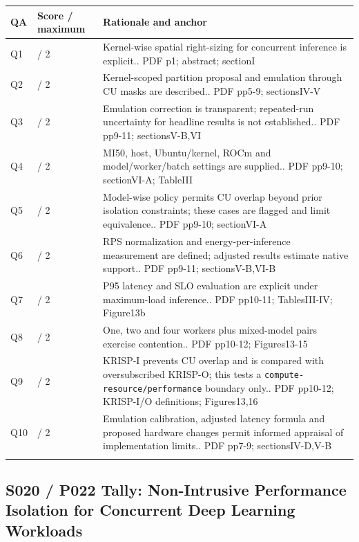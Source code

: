 \begin{longtable}{>{\raggedright\arraybackslash}p{}>{\raggedright\arraybackslash}p{}>{\raggedright\arraybackslash}p{}}
\toprule
\textbf{QA} & \textbf{Score / maximum} & \textbf{Rationale and anchor}\\\midrule\endhead
Q1 & 2 / 2 & Kernel-wise spatial right-sizing for concurrent inference is explicit.. PDF p1; abstract; sectionI\\\addlinespace
Q2 & 2 / 2 & Kernel-scoped partition proposal and emulation through CU masks are described.. PDF pp5-9; sectionsIV-V\\\addlinespace
Q3 & 1 / 2 & Emulation correction is transparent; repeated-run uncertainty for headline results is not established.. PDF pp9-11; sectionsV-B,VI\\\addlinespace
Q4 & 2 / 2 & MI50, host, Ubuntu/kernel, ROCm and model/worker/batch settings are supplied.. PDF pp9-10; sectionVI-A; TableIII\\\addlinespace
Q5 & 1 / 2 & Model-wise policy permits CU overlap beyond prior isolation constraints; these cases are flagged and limit equivalence.. PDF pp9-10; sectionVI-A\\\addlinespace
Q6 & 2 / 2 & RPS normalization and energy-per-inference measurement are defined; adjusted results estimate native support.. PDF pp9-11; sectionsV-B,VI-B\\\addlinespace
Q7 & 2 / 2 & P95 latency and SLO evaluation are explicit under maximum-load inference.. PDF pp10-11; TablesIII-IV; Figure13b\\\addlinespace
Q8 & 2 / 2 & One, two and four workers plus mixed-model pairs exercise contention.. PDF pp10-12; Figures13-15\\\addlinespace
Q9 & 2 / 2 & KRISP-I prevents CU overlap and is compared with oversubscribed KRISP-O; this tests a \nolinkurl{compute-resource/performance} boundary only.. PDF pp10-12; KRISP-I/O definitions; Figures13,16\\\addlinespace
Q10 & 2 / 2 & Emulation calibration, adjusted latency formula and proposed hardware changes permit informed appraisal of implementation limits.. PDF pp7-9; sectionsIV-D,V-B\\\addlinespace
\bottomrule\end{longtable}

\clearpage\subsection{S020 / P022 Tally: Non-Intrusive Performance Isolation for Concurrent Deep Learning Workloads}

